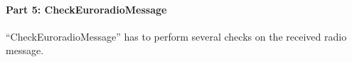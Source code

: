 \documentclass{template/openetcs_report}
\begin{document}
% 
% 

\paragraph{Part 5: CheckEuroradioMessage}
``CheckEuroradioMessage'' has to perform several checks on the received radio message.
\end{document}
